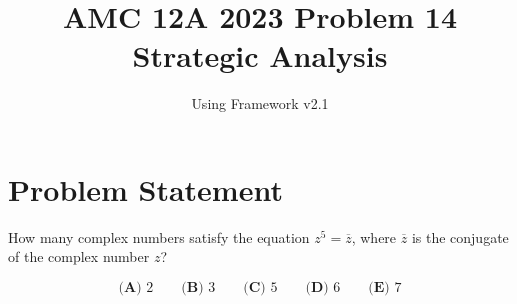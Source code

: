 \documentclass[11pt]{article}
\begin{document}
\title{\textbf{AMC 12A 2023 Problem 14}\\Strategic Analysis}
\author{Using Framework v2.1}
\date{}
\maketitle

\section*{Problem Statement}

How many complex numbers satisfy the equation $z^5=\overline{z}$, where $\overline{z}$ is the conjugate of the complex number $z$?

\[\textbf{(A) } 2 \qquad \textbf{(B) } 3 \qquad \textbf{(C) } 5 \qquad \textbf{(D) } 6 \qquad \textbf{(E) } 7\]
\end{document}
